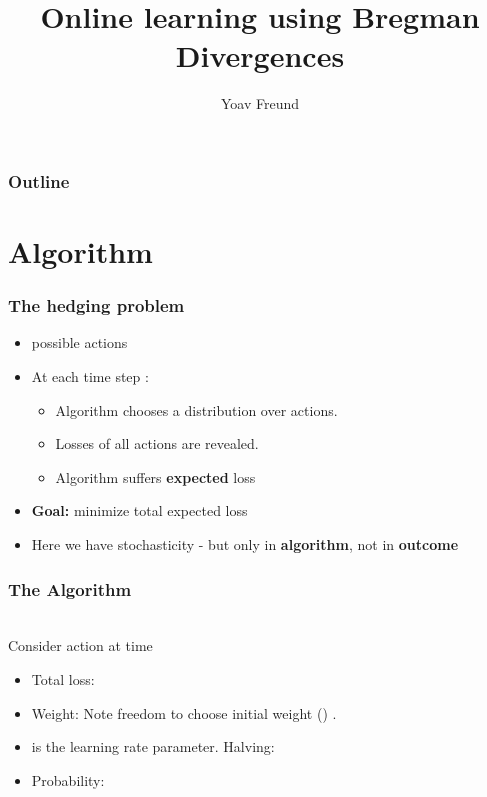 \documentclass[handout]{beamer}
\title[\ouralg] %
{Online learning using Bregman Divergences}
\author[Freund] %
{Yoav Freund}
\institute[Universities of Somewhere and Elsewhere] %
\begin{document}

\begin{frame}
  \titlepage
  \begin{small}
  \end{small}
\end{frame}

\begin{frame}
  \frametitle{Outline}
  \tableofcontents[pausesections]
\end{frame}


\section{\ouralg Algorithm}

\begin{frame}
\frametitle{The hedging problem}

\begin{itemize}
\item {} possible actions 

\item At each time step :
\begin{itemize}
\item Algorithm chooses a distribution  over actions.
\item Losses  of all actions  are revealed.
\item Algorithm suffers {\bf expected} loss 
\end{itemize}
\item {{\bf Goal:} minimize total expected loss}
\item {Here we have stochasticity - but only in {\bf algorithm}, not in {\bf outcome}}
\end{itemize}
\end{frame}

\begin{frame}
\frametitle{The \ouralg Algorithm}
~\\
Consider action  at time 
\begin{itemize}
\item Total loss:
\item Weight:
Note freedom to choose initial weight ()
.
\item
{} is the learning rate parameter. Halving: \R{$\eta \to \infty$}

\item Probability:
\end{itemize}
\end{frame}
\end{document}
